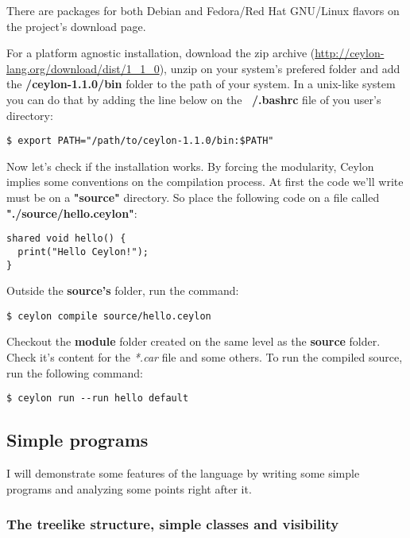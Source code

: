 There are packages for both Debian and Fedora/Red Hat GNU/Linux flavors on the
project's download page\cite{1_10}.

For a platform agnostic installation, download the zip archive
(\url{http://ceylon-lang.org/download/dist/1_1_0}),
unzip on your system's prefered folder and add the \textbf{/ceylon-1.1.0/bin}
folder to the path of your system. In a unix-like system you can do that by
adding the line below on the \textbf{~/.bashrc} file of you user's directory:

\begin{verbatim}
$ export PATH="/path/to/ceylon-1.1.0/bin:$PATH"
\end{verbatim}

Now let's check if the installation works. By forcing the modularity, Ceylon
implies some conventions on the compilation process. At first the code we'll
write must be on a \textbf{"source"} directory. So place the following code on a
file called \textbf{"./source/hello.ceylon"}:

\begin{lstlisting}[label=hello,caption=Ceylon Hello World]
shared void hello() {
  print("Hello Ceylon!");
}
\end{lstlisting}

Outside the \textbf{source's} folder, run the command:

\begin{verbatim}
$ ceylon compile source/hello.ceylon
\end{verbatim}

Checkout the \textbf{module} folder created on the same level as the
\textbf{source} folder. Check it's content for the \textit{*.car} file and some
others. To run the compiled source, run the following command:

\begin{verbatim}
$ ceylon run --run hello default
\end{verbatim}

\subsection{Simple programs}

I will demonstrate some features of the language by writing some simple programs
and analyzing some points right after it.

\subsubsection{The treelike structure, simple classes and visibility}

